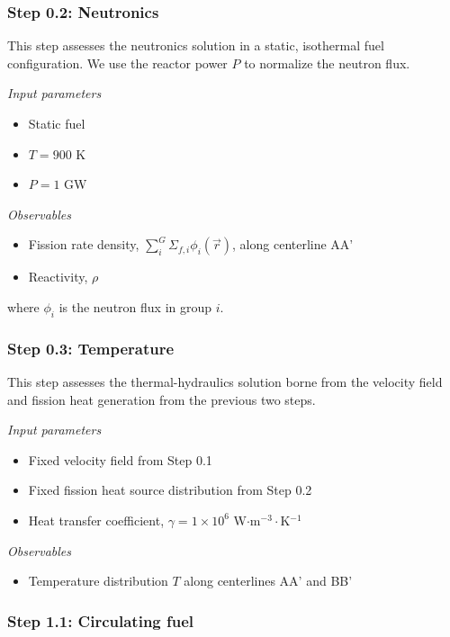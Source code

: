 \subsubsection{Step 0.2: Neutronics}

This step assesses the neutronics solution in a static, isothermal fuel
configuration. We use the reactor power $P$ to normalize the neutron flux.

\textit{Input parameters}
%
\begin{itemize}
    \itemsep0em
    \item Static fuel
    \item $T = 900$ K
    \item $P = 1$ GW
\end{itemize}

\textit{Observables}
\begin{itemize}
    \itemsep0em
    \item Fission rate density, $\sum^G_i \Sigma_{f,i} \phi_i(\vec{r})$, along
    centerline AA'
    \item Reactivity, $\rho$
\end{itemize}
where $\phi_i$ is the neutron flux in group $i$.

\subsubsection{Step 0.3: Temperature}

This step assesses the thermal-hydraulics solution borne from the velocity
field and fission heat generation from the previous two steps.

\textit{Input parameters}
%
\begin{itemize}
    \itemsep0em
    \item Fixed velocity field from Step 0.1
    \item Fixed fission heat source distribution from Step 0.2
    \item Heat transfer coefficient, $\gamma = 1 \times 10^6$ W$\cdot$m$^{-3}
    \cdot$K$^{-1}$
\end{itemize}

\textit{Observables}
\begin{itemize}
    \itemsep0em
    \item Temperature distribution $T$ along centerlines AA' and BB'
\end{itemize}

\subsubsection{Step 1.1: Circulating fuel}

